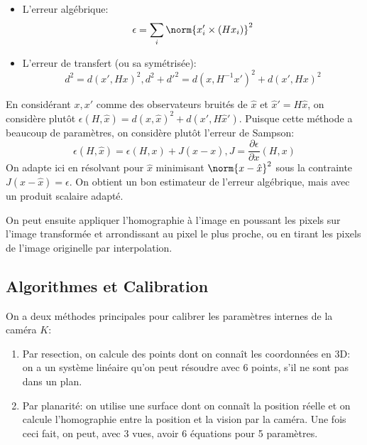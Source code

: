 \documentclass[info, math]{mpb-cours}
\begin{document}
\begin{itemize}
	\item L'erreur algébrique:
	      \begin{equation*}
		      \epsilon = \sum_{i} \norm{x_{i}' \times (Hx_{i})}^{2}
	      \end{equation*}
	\item L'erreur de transfert (ou sa symétrisée):
	      \begin{equation*}
		      d^{2} = d(x', Hx)^{2}, d^{2} + d'^{2} = d(x, H^{-1}x')^{2} + d(x', Hx)^{2}
	      \end{equation*}
\end{itemize}

En considérant $x, x'$ comme des observateurs bruités de $\hat{x}$ et $\hat{x}' = H\hat{x}$, on considère plutôt $\epsilon(H, \hat{x}) = d(x, \hat{x})^{2} + d(x', H\hat{x}')$.
Puisque cette méthode a beaucoup de paramètres, on considère plutôt l'erreur de Sampson:
\begin{equation*}
	\epsilon(H, \hat{x}) = \epsilon(H, x) + J(\hat{x} - x), J = \frac{\partial \epsilon}{\partial x}(H, x)
\end{equation*}
On adapte ici en résolvant pour $\hat{x}$ minimisant $\norm{x - \hat{x}}^{2}$ sous la contrainte $J(x - \hat{x}) = \epsilon$.
On obtient un bon estimateur de l'erreur algébrique, mais avec un produit scalaire adapté.

On peut ensuite appliquer l'homographie à l'image en poussant les pixels sur l'image transformée et arrondissant au pixel le plus proche, ou en tirant les pixels de l'image originelle par interpolation.


\subsection{Algorithmes et Calibration}
On a deux méthodes principales pour calibrer les paramètres internes de la caméra $K$:
\begin{enumerate}
	\item Par resection, on calcule des points dont on connaît les coordonnées en 3D: on a un système linéaire qu'on peut résoudre avec 6 points, s'il ne sont pas dans un plan.
	\item Par planarité: on utilise une surface dont on connaît la position réelle et on calcule l'homographie entre la position et la vision par la caméra.
	      Une fois ceci fait, on peut, avec 3 vues, avoir 6 équations pour 5 paramètres.
\end{enumerate}
\end{document}
